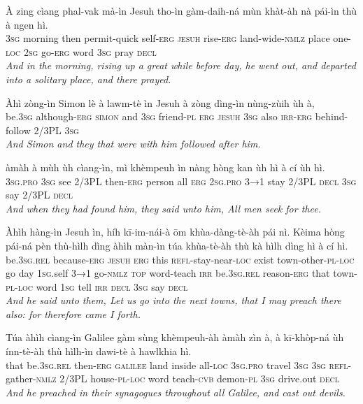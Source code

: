 \documentclass[11pt,a4paper]{article}
\begin{document}
\begin{exe}
\gll À zing cìang phal-vak mà-ìn Jesuh tho-ìn gàm-daih-ná mùn khàt-àh nà pái-ìn thù à ngen hì. \\
     \textsc{3sg} morning then permit-quick self-\textsc{erg} \textsc{jesuh} rise-\textsc{erg} land-wide-\textsc{nmlz} place one-\textsc{loc} \textsc{2sg} go-\textsc{erg} word \textsc{3sg} pray \textsc{decl} \\
\glt \textcolor{kjvcolor}{\textit{And in the morning, rising up a great while before day, he went out, and departed into a solitary place, and there prayed.}}

\gll Àhì zòng-ìn Simon lè à lawm-tè ìn Jesuh à zòng dìng-ìn nùng-zùih ùh à, \\
     be.\textsc{3sg} although-\textsc{erg} \textsc{simon} and \textsc{3sg} friend-\textsc{pl} \textsc{erg} \textsc{jesuh} \textsc{3sg} also \textsc{irr}-\textsc{erg} behind-follow 2/3PL \textsc{3sg} \\
\glt \textcolor{kjvcolor}{\textit{And Simon and they that were with him followed after him.}}

\gll àmàh à mùh ùh cìang-ìn, mì khèmpeuh ìn nàng hòng kan ùh hì à cí ùh hì. \\
     \textsc{3sg}.\textsc{pro} \textsc{3sg} see 2/3PL then-\textsc{erg} person all \textsc{erg} \textsc{2sg}.\textsc{pro} \textsc{3→1} stay 2/3PL \textsc{decl} \textsc{3sg} say 2/3PL \textsc{decl} \\
\glt \textcolor{kjvcolor}{\textit{And when they had found him, they said unto him, All men seek for thee.}}

\gll Àhìh hàng-ìn Jesuh ìn, híh kī-im-nái-à ōm khùa-dàng-tè-àh pái nì. Kèima hòng pái-ná pèn thù-hìlh dìng àhìh màn-ìn túa khùa-tè-àh thù kà hìlh dìng hì à cí hì. \\
     be.\textsc{3sg}.\textsc{rel} because-\textsc{erg} \textsc{jesuh} \textsc{erg} this \textsc{refl}-stay-near-\textsc{loc} exist town-other-\textsc{pl}-\textsc{loc} go day \textsc{1sg}.self \textsc{3→1} go-\textsc{nmlz} \textsc{top} word-teach \textsc{irr} be.\textsc{3sg}.\textsc{rel} reason-\textsc{erg} that town-\textsc{pl}-\textsc{loc} word \textsc{1sg} tell \textsc{irr} \textsc{decl} \textsc{3sg} say \textsc{decl} \\
\glt \textcolor{kjvcolor}{\textit{And he said unto them, Let us go into the next towns, that I may preach there also: for therefore came I forth.}}

\gll Túa àhìh cìang-ìn Galilee gàm sùng khèmpeuh-àh àmàh zìn à, à kī-khòp-ná ùh ínn-tè-àh thù hìlh-ìn dawi-tè à hawlkhia hì. \\
     that be.\textsc{3sg}.\textsc{rel} then-\textsc{erg} \textsc{galilee} land inside all-\textsc{loc} \textsc{3sg}.\textsc{pro} travel \textsc{3sg} \textsc{3sg} \textsc{refl}-gather-\textsc{nmlz} 2/3PL house-\textsc{pl}-\textsc{loc} word teach-\textsc{cvb} demon-\textsc{pl} \textsc{3sg} drive.out \textsc{decl} \\
\glt \textcolor{kjvcolor}{\textit{And he preached in their synagogues throughout all Galilee, and cast out devils.}}


\end{exe}
\end{document}
